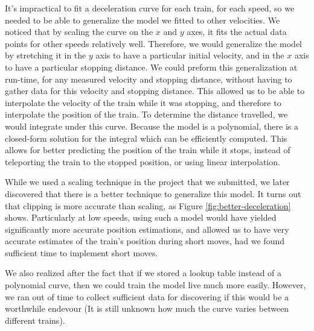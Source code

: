 \documentclass{article}
\begin{document}
It's impractical to fit a deceleration curve for each train, for each speed,
so we needed to be able to generalize the model we fitted to other velocities.
We noticed that by scaling the curve on the $x$ and $y$ axes, it fits
the actual data points for other speeds relatively well.
Therefore, we would generalize the model by stretching it in the $y$ axis
to have a particular initial velocity, and in the $x$ axis to have a particular
stopping distance.
We could preform this generalization at run-time, for any measured velocity and
stopping distance, without having to gather data for this velocity and stopping distance.
This allowed us to be able to interpolate the velocity of the train while
it was stopping, and therefore to interpolate the position of the train.
To determine the distance travelled, we would integrate under this curve.
Because the model is a polynomial, there is a closed-form solution
for the integral which can be efficiently computed.
This allows for better predicting the position of the train
while it stops, instead of teleporting the train to the stopped position,
or using linear interpolation.

While we used a scaling technique in the project that we submitted, we later
discovered that there is a better technique to generalize this model. It
turns out that clipping is more accurate than scaling, as
Figure \ref{fig:better-deceleration} shows. Particularly at low speeds, using
such a model would have yielded significantly more accurate position
estimations, and allowed us to have very accurate estimates of the train's
position during short moves, had we found sufficient time to implement short
moves.

We also realized after the fact that if we stored a lookup table instead of a
polynomial curve, then we could train the model live much more easily.
However, we ran out of time to collect sufficient data for discovering if
this would be a worthwhile endevour (It is still unknown how much the curve
varies between different trains).
\end{document}
